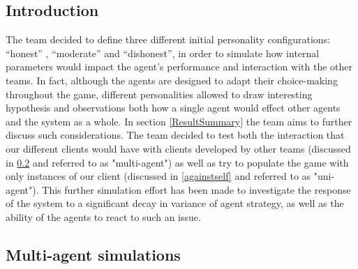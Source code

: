 \subsection{Introduction}
The team decided to define three different initial personality configurations:
“honest” , “moderate” and “dishonest”, in order to simulate how internal parameters would impact the agent's performance and interaction with the other teams.
In fact, although the agents are designed to adapt their choice-making throughout the game, different personalities allowed to draw interesting hypothesis and observations both how a single agent would effect other agents and the system as a whole. In section \ref{ResultSummary} the team aims to further discuss such considerations. 
The team decided to test both the interaction that our different clients would have with clients developed by other teams (discussed in \ref{againstothers} and referred to as "multi-agent") as well as try to populate the game with only instances of our client (discussed in \ref{againstself} and referred to as "uni-agent"). This further simulation effort has been made to investigate the response of the system to a significant decay in variance of agent strategy, as well as the ability of the agents to react to such an issue. 

\subsection{Multi-agent simulations} \label{againstothers}
